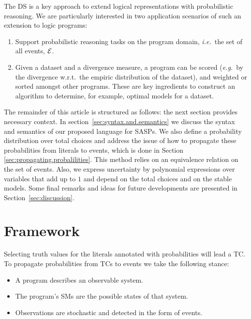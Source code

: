 \documentclass[x11names]{tlp}
\renewcommand{\cite}{\citep}
\begin{document}
The \ac{DS} \cite{sato1995statistical,riguzzi2022foundations} is a key
approach to extend logical representations with probabilistic reasoning. We
are particularly interested in two application scenarios of such an extension
to logic programs:
\begin{enumerate}

	\item Support probabilistic reasoning tasks on the program domain,
	      \textit{i.e.}~the set of all events, $\EVENTSset$.

	\item Given a dataset and a divergence measure, a program can be scored
	      (\textit{e.g.}~by the divergence w.r.t.~the empiric distribution of the
	      dataset), and weighted or sorted amongst other programs. These are key
	      ingredients to construct an algorithm to determine, for example, optimal
	      models for a dataset.

\end{enumerate}

\noindent The remainder of this article is structured as follows: the
next section provides necessary context.  In
section~\ref{sec:syntax.and.semantics} we discuss the syntax and
semantics of our proposed language for \Acfp{SASP}.  We also define a
probability distribution over total choices and address the issue of
how to propagate these probabilities from literals to events, which is
done in Section \ref{sec:propagating.probalilities}.  This method
relies on an equivalence relation on the set of events.  Also, we
express uncertainty by polynomial expressions over variables that add
up to $1$ and depend on the total choices and on the stable models.
Some final remarks and ideas for future developments are presented in
Section~\ref{sec:discussion}.

\section{Framework}
\label{sec:framework}

Selecting truth values for the literals annotated with probabilities will
lead a \acf{TC}. To propagate probabilities from \aclp{TC} to events we take
the following stance: %
\begin{itemize}
	\item A program describes an observable system.
	\item The program's \aclp{SM} are the possible states of that system.
	\item Observations are stochastic and detected in the form of events.
\end{itemize}
\end{document}
